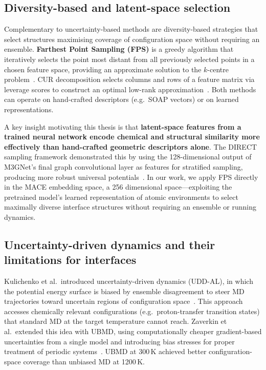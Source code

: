 \documentclass[12pt,a4paper,oneside]{book}
\begin{document}
\subsection{Diversity-based and latent-space selection}

Complementary to uncertainty-based methods are diversity-based strategies that select structures maximising coverage of configuration space without requiring an ensemble. \textbf{Farthest Point Sampling (FPS)} is a greedy algorithm that iteratively selects the point most distant from all previously selected points in a chosen feature space, providing an approximate solution to the $k$-centre problem~\cite{Cersonsky2021}. CUR decomposition selects columns and rows of a feature matrix via leverage scores to construct an optimal low-rank approximation~\cite{Imbalzano2018}. Both methods can operate on hand-crafted descriptors (e.g.\ SOAP vectors) or on learned representations.

A key insight motivating this thesis is that \textbf{latent-space features from a trained neural network encode chemical and structural similarity more effectively than hand-crafted geometric descriptors alone}. The DIRECT sampling framework demonstrated this by using the 128-dimensional output of M3GNet's final graph convolutional layer as features for stratified sampling, producing more robust universal potentials~\cite{Qi2024}. In our work, we apply FPS directly in the MACE embedding space, a 256 dimensional space---exploiting the pretrained model's learned representation of atomic environments to select maximally diverse interface structures without requiring an ensemble or running dynamics.

\subsection{Uncertainty-driven dynamics and their limitations for interfaces}

Kulichenko et al.\ introduced uncertainty-driven dynamics (UDD-AL), in which the potential energy surface is biased by ensemble disagreement to steer MD trajectories toward uncertain regions of configuration space~\cite{Kulichenko2023}. This approach accesses chemically relevant configurations (e.g.\ proton-transfer transition states) that standard MD at the target temperature cannot reach. Zaverkin et al.\ extended this idea with UBMD, using computationally cheaper gradient-based uncertainties from a single model and introducing bias stresses for proper treatment of periodic systems~\cite{Zaverkin2024}. UBMD at 300\,K achieved better configuration-space coverage than unbiased MD at 1200\,K.
\end{document}
